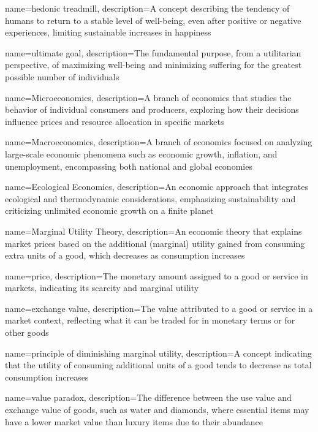 {
	name=hedonic treadmill,
	description={A concept describing the tendency of humans to return to a stable level of well-being, even after positive or negative experiences, limiting sustainable increases in happiness}
}

{
	name=ultimate goal,
	description={The fundamental purpose, from a utilitarian perspective, of maximizing well-being and minimizing suffering for the greatest possible number of individuals}
}

{
	name=Microeconomics,
	description={A branch of economics that studies the behavior of individual consumers and producers, exploring how their decisions influence prices and resource allocation in specific markets}
}

{
	name=Macroeconomics,
	description={A branch of economics focused on analyzing large-scale economic phenomena such as economic growth, inflation, and unemployment, encompassing both national and global economies}
}

{
	name=Ecological Economics,
	description={An economic approach that integrates ecological and thermodynamic considerations, emphasizing sustainability and criticizing unlimited economic growth on a finite planet}
}

{
	name=Marginal Utility Theory,
	description={An economic theory that explains market prices based on the additional (marginal) utility gained from consuming extra units of a good, which decreases as consumption increases}
}

{
	name=price,
	description={The monetary amount assigned to a good or service in markets, indicating its scarcity and marginal utility}
}

{
	name=exchange value,
	description={The value attributed to a good or service in a market context, reflecting what it can be traded for in monetary terms or for other goods}
}

{
	name=principle of diminishing marginal utility,
	description={A concept indicating that the utility of consuming additional units of a good tends to decrease as total consumption increases}
}

{
	name=value paradox,
	description={The difference between the use value and exchange value of goods, such as water and diamonds, where essential items may have a lower market value than luxury items due to their abundance}
}

